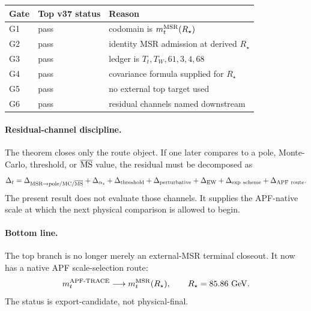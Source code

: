 \begin{center}
\renewcommand{\arraystretch}{1.2}
\begin{tabular}{lll}
\hline
\textbf{Gate} & \textbf{Top v37 status} & \textbf{Reason}\\
\hline
G1 & pass & codomain is \(m_t^{\rm MSR}(R_\star)\)\\
G2 & pass & identity MSR admission at derived \(R_\star\)\\
G3 & pass & ledger is \(T_t,T_W,61,3,4,68\)\\
G4 & pass & covariance formula supplied for \(R_\star\)\\
G5 & pass & no external top target used\\
G6 & pass & residual channels named downstream\\
\hline
\end{tabular}
\end{center}

\paragraph{Residual-channel discipline.}
The theorem closes only the route object.  If one later compares to a pole, Monte-Carlo, threshold, or \(\overline{\rm MS}\) value, the residual must be decomposed as
\[
        \Delta_t=
        \Delta_{\rm MSR\to pole/MC/\overline{MS}}
        +\Delta_{\alpha_s}
        +\Delta_{\rm threshold}
        +\Delta_{\rm perturbative}
        +\Delta_{\rm EW}
        +\Delta_{\rm exp\ scheme}
        +\Delta_{\rm APF\ route}.
\]
The present result does not evaluate those channels.  It supplies the APF-native scale at which the next physical comparison is allowed to begin.

\paragraph{Bottom line.}
The top branch is no longer merely an external-MSR terminal closeout.  It now has a native APF scale-selection route:
\[
        m_t^{\rm APF\text{-}TRACE}
        \longrightarrow
        m_t^{\rm MSR}(R_\star),
        \qquad
        R_\star=85.86\ {\rm GeV}.
\]
The status is export-candidate, not physical-final.
